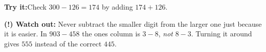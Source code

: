 \documentclass[12pt]{article}
\begin{document}
\begin{tryitbox}
\textbf{Try it:}\quad Check $300 - 126 = 174$ by adding $174 + 126$.\\[2pt]
\end{tryitbox}

\begin{watchoutbox}
\textbf{(!) Watch out:} Never subtract the smaller digit from the larger one just
because it is easier. In $903 - 458$ the ones column is $3 - 8$, \emph{not}
$8 - 3$. Turning it around gives $555$ instead of the correct $445$.
\end{watchoutbox}
\end{document}
